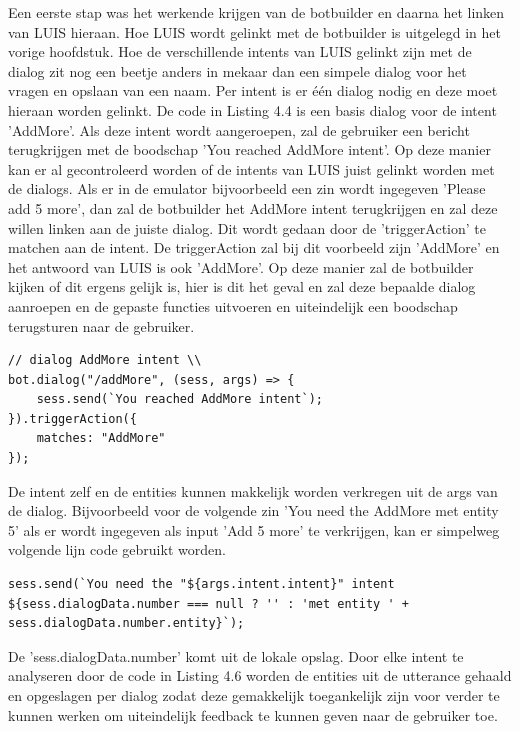 Een eerste stap was het werkende krijgen van de botbuilder en daarna het linken van LUIS hieraan. Hoe LUIS wordt gelinkt met de botbuilder is uitgelegd in het vorige hoofdstuk. Hoe de verschillende intents van LUIS gelinkt zijn met de dialog zit nog een beetje anders in mekaar dan een simpele dialog voor het vragen en opslaan van een naam. Per intent is er één dialog nodig en deze moet hieraan worden gelinkt. De code in Listing 4.4 is een basis dialog voor de intent 'AddMore'. Als deze intent wordt aangeroepen, zal de gebruiker een bericht terugkrijgen met de boodschap 'You reached AddMore intent'. Op deze manier kan er al gecontroleerd worden of de intents van LUIS juist gelinkt worden met de dialogs. Als er in de emulator bijvoorbeeld een zin wordt ingegeven 'Please add 5 more', dan zal de botbuilder het AddMore intent terugkrijgen en zal deze willen linken aan de juiste dialog. Dit wordt gedaan door de 'triggerAction' te matchen aan de intent. De triggerAction zal bij dit voorbeeld zijn 'AddMore' en het antwoord van LUIS is ook 'AddMore'. Op deze manier zal de botbuilder kijken of dit ergens gelijk is, hier is dit het geval en zal deze bepaalde dialog aanroepen en de gepaste functies uitvoeren en uiteindelijk een boodschap terugsturen naar de gebruiker.

\medskip
\begin{lstlisting}[caption=Dialog]
// dialog AddMore intent \\
bot.dialog("/addMore", (sess, args) => {
	sess.send(`You reached AddMore intent`);
}).triggerAction({
	matches: "AddMore"
});
\end{lstlisting}

De intent zelf en de entities kunnen makkelijk worden verkregen uit de args van de dialog. Bijvoorbeeld voor de volgende zin 'You need the AddMore met entity 5' als er wordt ingegeven als input 'Add 5 more' te verkrijgen, kan er simpelweg volgende lijn code gebruikt worden.

\medskip
\begin{lstlisting}[caption=Gebruiken van args]
sess.send(`You need the "${args.intent.intent}" intent ${sess.dialogData.number === null ? '' : 'met entity ' + sess.dialogData.number.entity}`);
\end{lstlisting}

De 'sess.dialogData.number' komt uit de lokale opslag. Door elke intent te analyseren door de code in Listing 4.6 worden de entities uit de utterance gehaald en opgeslagen per dialog zodat deze gemakkelijk toegankelijk zijn voor verder te kunnen werken om uiteindelijk feedback te kunnen geven naar de gebruiker toe. 

